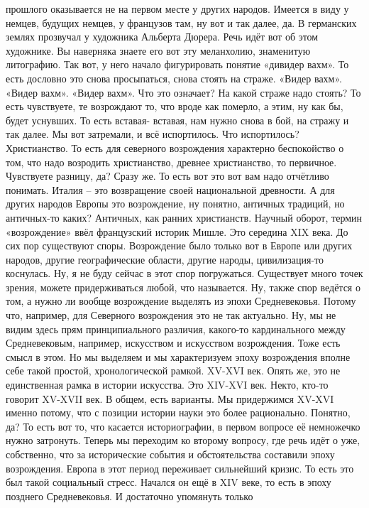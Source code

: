 прошлого оказывается не на первом месте у других народов. Имеется в виду у
немцев, будущих немцев, у французов там, ну вот и так далее, да. В германских
землях прозвучал у художника Альберта Дюрера. Речь идёт вот об этом художнике.
Вы наверняка знаете его вот эту меланхолию, знаменитую литографию. Так вот, у
него начало фигурировать понятие «дивидер вахм». То есть дословно это снова
просыпаться, снова стоять на страже. «Видер вахм». «Видер вахм». «Видер вахм».
Что это означает? На какой страже надо стоять? То есть чувствуете, те возрождают
то, что вроде как померло, а этим, ну как бы, будет уснувших. То есть вставая-
вставая, нам нужно снова в бой, на стражу и так далее. Мы вот затремали, и всё
испортилось. Что испортилось? Христианство. То есть для северного возрождения
характерно беспокойство о том, что надо возродить христианство, древнее
христианство, то первичное. Чувствуете разницу, да? Сразу же. То есть вот это
вот вам надо отчётливо понимать. Италия – это возвращение своей национальной
древности. А для других народов Европы это возрождение, ну понятно, античных
традиций, но античных-то каких? Античных, как ранних христианств. Научный
оборот, термин «возрождение» ввёл французский историк Мишле. Это середина XIX
века. До сих пор существуют споры. Возрождение было только вот в Европе или
других народов, другие географические области, другие народы, цивилизация-то
коснулась. Ну, я не буду сейчас в этот спор погружаться. Существует много точек
зрения, можете придерживаться любой, что называется. Ну, также спор ведётся о
том, а нужно ли вообще возрождение выделять из эпохи Средневековья. Потому что,
например, для Северного возрождения это не так актуально. Ну, мы не видим здесь
прям принципиального различия, какого-то кардинального между Средневековым,
например, искусством и искусством возрождения. Тоже есть смысл в этом. Но мы
выделяем и мы характеризуем эпоху возрождения вполне себе такой простой,
хронологической рамкой. XV-XVI век. Опять же, это не единственная рамка в
истории искусства. Это XIV-XVI век. Некто, кто-то говорит XV-XVII век. В общем,
есть варианты. Мы придержимся XV-XVI именно потому, что с позиции истории науки
это более рационально. Понятно, да? То есть вот то, что касается историографии,
в первом вопросе её немножечко нужно затронуть. Теперь мы переходим ко второму
вопросу, где речь идёт о уже, собственно, что за исторические события и
обстоятельства составили эпоху возрождения. Европа в этот период переживает
сильнейший кризис. То есть это был такой социальный стресс. Начался он ещё в XIV
веке, то есть в эпоху позднего Средневековья. И достаточно упомянуть только
